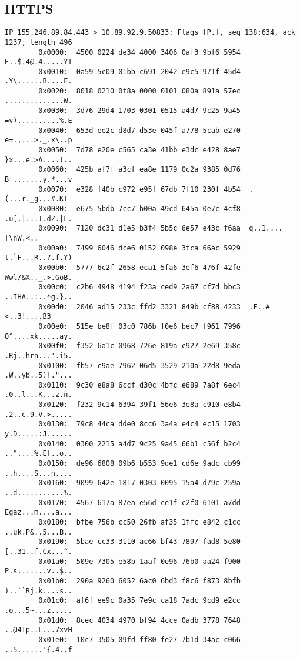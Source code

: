 \documentclass[xga]{xdvislides}
\begin{document}
\subsection{HTTPS}
\small
\begin{verbatim}
IP 155.246.89.84.443 > 10.89.92.9.50833: Flags [P.], seq 138:634, ack 1237, length 496
        0x0000:  4500 0224 de34 4000 3406 0af3 9bf6 5954  E..$.4@.4.....YT
        0x0010:  0a59 5c09 01bb c691 2042 e9c5 971f 45d4  .Y\......B....E.
        0x0020:  8018 0210 0f8a 0000 0101 080a 891a 57ec  ..............W.
        0x0030:  3d76 29d4 1703 0301 0515 a4d7 9c25 9a45  =v)..........%.E
        0x0040:  653d ee2c d8d7 d53e 045f a778 5cab e270  e=.,...>._.x\..p
        0x0050:  7d78 e20e c565 ca3e 41bb e3dc e428 8ae7  }x...e.>A....(..
        0x0060:  425b af7f a3cf ea8e 1179 0c2a 9385 0d76  B[.......y.*...v
        0x0070:  e328 f40b c972 e95f 67db 7f10 230f 4b54  .(...r._g...#.KT
        0x0080:  e675 5bdb 7cc7 b00a 49cd 645a 0e7c 4cf8  .u[.|...I.dZ.|L.
        0x0090:  7120 dc31 d1e5 b3f4 5b5c 6e57 e43c f6aa  q..1....[\nW.<..
        0x00a0:  7499 6046 dce6 0152 098e 3fca 66ac 5929  t.`F...R..?.f.Y)
        0x00b0:  5777 6c2f 2658 eca1 5fa6 3ef6 476f 42fe  Wwl/&X.._.>.GoB.
        0x00c0:  c2b6 4948 4194 f23a ced9 2a67 cf7d bbc3  ..IHA..:..*g.}..
        0x00d0:  2046 ad15 233c ffd2 3321 849b cf88 4233  .F..#<..3!....B3
        0x00e0:  515e be8f 03c0 786b f0e6 bec7 f961 7996  Q^....xk.....ay.
        0x00f0:  f352 6a1c 0968 726e 819a c927 2e69 358c  .Rj..hrn...'.i5.
        0x0100:  fb57 c9ae 7962 06d5 3529 210a 22d8 9eda  .W..yb..5)!."...
        0x0110:  9c30 e8a8 6ccf d30c 4bfc e689 7a8f 6ec4  .0..l...K...z.n.
        0x0120:  f232 9c14 6394 39f1 56e6 3e8a c910 e8b4  .2..c.9.V.>.....
        0x0130:  79c8 44ca dde0 8cc6 3a4a e4c4 ec15 1703  y.D.....:J......
        0x0140:  0300 2215 a4d7 9c25 9a45 66b1 c56f b2c4  .."....%.Ef..o..
        0x0150:  de96 6808 09b6 b553 9de1 cd6e 9adc cb99  ..h....S...n....
        0x0160:  9099 642e 1817 0303 0095 15a4 d79c 259a  ..d...........%.
        0x0170:  4567 617a 87ea e56d ce1f c2f0 6101 a7dd  Egaz...m....a...
        0x0180:  bfbe 756b cc50 26fb af35 1ffc e842 c1cc  ..uk.P&..5...B..
        0x0190:  5bae cc33 3110 ac66 bf43 7897 fad8 5e80  [..31..f.Cx...^.
        0x01a0:  509e 7305 e58b 1aaf 0e96 76b0 aa24 f900  P.s.......v..$..
        0x01b0:  290a 9260 6052 6ac0 6bd3 f8c6 f873 8bfb  )..``Rj.k....s..
        0x01c0:  af6f ee9c 0a35 7e9c ca18 7adc 9cd9 e2cc  .o...5~...z.....
        0x01d0:  8cec 4034 4970 bf94 4cce 0adb 3778 7648  ..@4Ip..L...7xvH
        0x01e0:  10c7 3505 09fd ff80 fe27 7b1d 34ac c066  ..5......'{.4..f
\end{verbatim}
\Normalsize
\end{document}
